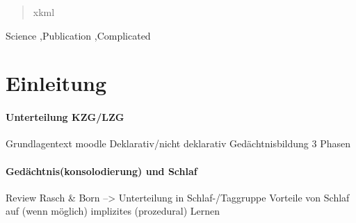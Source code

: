 




\begin{frontmatter}
\begin{abstract}
    xkml
\end{abstract}
\begin{keyword}
Science \sep Publication \sep Complicated
\end{keyword}
\end{frontmatter}





\newpage


\newpage



\tableofcontents
\clearpage
{}
\newpage

\pagestyle{mainmatter}
\section{Einleitung}
\label{S:1}


\paragraph{Unterteilung KZG/LZG}
Grundlagentext moodle
Deklarativ/nicht deklarativ
Gedächtnisbildung 3 Phasen

\paragraph{Gedächtnis(konsolodierung) und Schlaf}
Review Rasch \& Born
--> Unterteilung in Schlaf-/Taggruppe
Vorteile von Schlaf auf (wenn möglich) implizites (prozedural) Lernen

